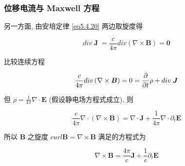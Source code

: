 \documentclass[aspectratio=2516]{beamer}
\begin{document}

\begin{frame}
\frametitle{\kaishu 位移电流与 Maxwell 方程}

\kaishu

\small

另一方面, 由安培定律 \ref{eq5.4.20} 两边取旋度得

\begin{equation}
div\;\boldsymbol{J}\; = \frac{c}{{4\pi }}div\left( {\nabla  \times \boldsymbol{B}} \right) = \boldsymbol{0}
\label{eq5.4.28}
\end{equation}

比较连续方程

\begin{equation}
\frac{c}{{4\pi }}div\left( {\nabla  \times \boldsymbol{B}} \right) = 0 = \frac{\partial }{{\partial t}}\rho  + div\;\boldsymbol{J}
\notag 
\end{equation}

但 $\rho  = \frac{1}{{4\pi }}\nabla  \cdot \boldsymbol{E}$ (假设静电场方程式成立), 则

\begin{equation}
\frac{c}{{4\pi }}\nabla  \cdot \left( {\nabla  \times \boldsymbol{B}} \right) = \nabla  \cdot \boldsymbol{J} + \frac{1}{{4\pi }}\nabla  \cdot {\partial _t}\boldsymbol{E}
\label{eq5.4.29}
\end{equation}

所以 $ \boldsymbol{B} $ 之旋度 $ curl \boldsymbol{B} = \nabla \times \boldsymbol{B} $ 满足的方程式为

\begin{equation}
\nabla  \times \boldsymbol{B} = \frac{{4\pi }}{c}\boldsymbol{J} + \frac{1}{c}{\partial _t}\boldsymbol{E}
\label{eq5.4.30}
\end{equation}

\end{frame}

\end{document}
